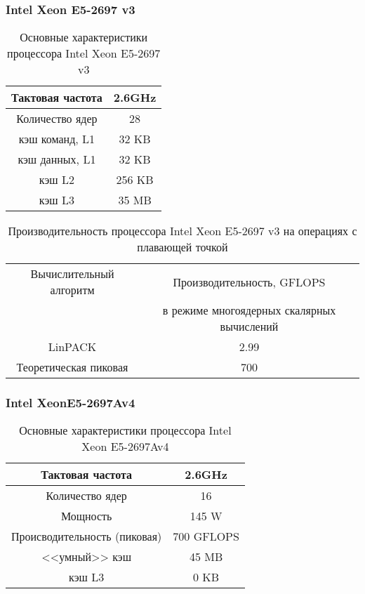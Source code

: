 \subsubsection{Intel Xeon E5-2697 v3}
\begin{table}[ht]
	\begin{center}
		\caption{Основные характеристики процессора Intel Xeon  E5-2697 v3}
		\begin{tabular}{|c|c|}
			\hline	
			Тактовая частота & 2.6GHz   \\ \hline
			Количество ядер & 28 	    \\ \hline
			кэш команд, L1 &  32 KB     \\ \hline
			кэш данных, L1 &  32 KB     \\ \hline
			кэш L2         &  256 KB    \\ \hline
			кэш L3         &  35 MB     \\ \hline
		\end{tabular}
	\end{center} 	
\end{table} 	

\begin{table}[ht]
	\begin{center}
		\caption{Производительность процессора Intel Xeon  E5-2697 v3 на операциях с плавающей точкой}
		\begin{tabular}{|c|c|}
			\hline	
			Вычислительный алгоритм &  Производительность, GFLOPS \\ 
			& в режиме многоядерных скалярных вычислений \\ \hline
		    LinPACK  &  2.99 	\\ \hline
			Теоретическая пиковая &  700   \\ \hline
		\end{tabular}
	\end{center} 	
\end{table} 

\clearpage	

\subsubsection{Intel XeonE5-2697Av4}

\begin{table}[ht]
	\begin{center}
		\caption{Основные характеристики процессора Intel Xeon  E5-2697Av4}
		\begin{tabular}{|c|c|}
			\hline	
			Тактовая частота & 2.6GHz   \\ \hline
			Количество ядер & 16 	     \\ \hline
			Мощность        &  145 W      \\ \hline
			Происводительность (пиковая) &  700 GFLOPS       \\ \hline
			<<умный>> кэш   &  45 MB      \\ \hline
			кэш L3          &  0 KB        \\ \hline
		\end{tabular}
	\end{center} 	
\end{table} 	




